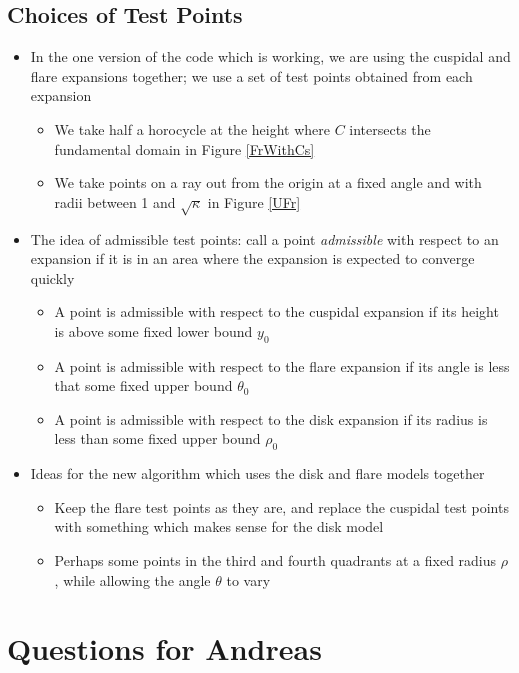 \documentclass[]{article}
\begin{document}
\subsection*{Choices of Test Points}
\begin{itemize}
	\item In the one version of the code which is working, we are using the cuspidal and flare expansions together; we use a set of test points obtained from each expansion
	\begin{itemize}
		\item We take half a horocycle at the height where $C$ intersects the fundamental domain in Figure \ref{FrWithCs}
		\item We take points on a ray out from the origin at a fixed angle and with radii between 1 and $\sqrt{\kappa}$ in Figure \ref{UFr}
	\end{itemize}
	\item The idea of admissible test points: call a point \textit{admissible} with respect to an expansion if it is in an area where the expansion is expected to converge quickly
	\begin{itemize}
		\item A point is admissible with respect to the cuspidal expansion if its height is above some fixed lower bound $y_0$
		\item A point is admissible with respect to the flare expansion if its angle is less that some fixed upper bound $\theta_0$
		\item A point is admissible with respect to the disk expansion if its radius is less than some fixed upper bound $\rho_0$
	\end{itemize}
	\item Ideas for the new algorithm which uses the disk and flare models together
	\begin{itemize}
		\item Keep the flare test points as they are, and replace the cuspidal test points with something which makes sense for the disk model
		\item Perhaps some points in the third and fourth quadrants at a fixed radius $\rho$, while allowing the angle $\theta$ to vary
	\end{itemize}
\end{itemize}

\section*{Questions for Andreas}
\end{document}
